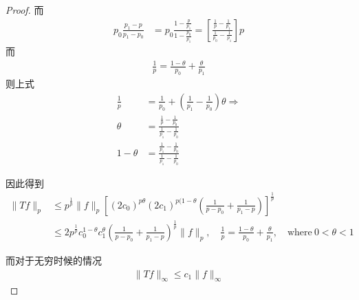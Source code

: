 \begin{proof}
    而
    \begin{align*}
        p_0 \frac{p_1 - p}{p_1 - p_0} &= p_0 \frac{1 - \frac{p}{p_1}}{1 -\frac{p_0}{p_1}} = \left[\frac{\frac{1}{p} - \frac{1}{p_1} }{\frac{1}{p_0} - \frac{1}{p_1}}\right] p
    \end{align*}
    而
    \begin{align*}
        \frac{1}{p} = \frac{1- \theta}{p_0} + \frac{\theta}{p_1}
    \end{align*}
    则上式
    \begin{align*}
        \frac{1}{p} &= \frac{1}{p_0} + \left(\frac{1}{p_1} - \frac{1}{p_0}\right)\theta \Rightarrow \\
        \theta &= \frac{\frac{1}{p} - \frac{1}{p_0}}{\frac{1}{p_1} - \frac{1}{p_0}} \\
        1 - \theta & = \frac{\frac{1}{p_1} - \frac{1}{p_0}}{\frac{1}{p_1} - \frac{1}{p_0}}
    \end{align*}

    因此得到
    \begin{align*}
        \|Tf\|_{p} &\leqslant p^{\frac{1}{p}} \|f\|_p \left[(2c_0)^{p\theta} (2c_1)^{p(1-\theta} \left(\frac{1}{p-p_0} + \frac{1}{p_1 - p} \right)\right]^{\frac{1}{p}} \\
        & \leqslant 2 p^{\frac{1}{p}} c_0^{1-\theta} c_1^{\theta} \left( \frac{1}{p-p_0} + \frac{1}{p_1 - p} \right)^{\frac{1}{p}} \|f\|_p, \quad \frac{1}{p} = \frac{1-\theta}{p_0} + \frac{\theta}{p_1},\quad \text{where}\ 0<\theta<1
    \end{align*}

    而对于无穷时候的情况
    \begin{align*}
        \|Tf\|_{\infty} \leqslant c_1 \|f\|_{\infty}
    \end{align*}
    
\end{proof}

